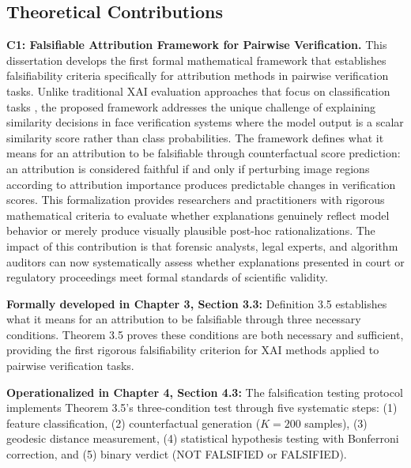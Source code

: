 \subsection{Theoretical Contributions}

\textbf{C1: Falsifiable Attribution Framework for Pairwise Verification.} This dissertation develops the first formal mathematical framework that establishes falsifiability criteria specifically for attribution methods in pairwise verification tasks. Unlike traditional XAI evaluation approaches that focus on classification tasks \cite{Adebayo2018_SanityChecks,hooker2019benchmark}, the proposed framework addresses the unique challenge of explaining similarity decisions in face verification systems where the model output is a scalar similarity score rather than class probabilities. The framework defines what it means for an attribution to be falsifiable through counterfactual score prediction: an attribution is considered faithful if and only if perturbing image regions according to attribution importance produces predictable changes in verification scores. This formalization provides researchers and practitioners with rigorous mathematical criteria to evaluate whether explanations genuinely reflect model behavior or merely produce visually plausible post-hoc rationalizations. The impact of this contribution is that forensic analysts, legal experts, and algorithm auditors can now systematically assess whether explanations presented in court or regulatory proceedings meet formal standards of scientific validity.

\vspace{0.3cm}
\noindent\textbf{Formally developed in Chapter 3, Section 3.3:} Definition 3.5 establishes what it means for an attribution to be falsifiable through three necessary conditions. Theorem 3.5 proves these conditions are both necessary and sufficient, providing the first rigorous falsifiability criterion for XAI methods applied to pairwise verification tasks.

\vspace{0.3cm}
\noindent\textbf{Operationalized in Chapter 4, Section 4.3:} The falsification testing protocol implements Theorem 3.5's three-condition test through five systematic steps: (1) feature classification, (2) counterfactual generation ($K=200$ samples), (3) geodesic distance measurement, (4) statistical hypothesis testing with Bonferroni correction, and (5) binary verdict (NOT FALSIFIED or FALSIFIED).

\vspace{0.5cm}

